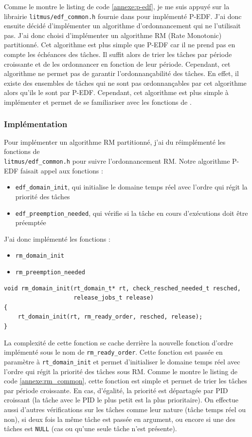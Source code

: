 Comme le montre le listing de code \ref{annexe:p-edf}, je me suis appuyé sur la librairie \texttt{litmus/edf\_common.h} fournie dans \litmus pour implémenté P-EDF. J'ai donc ensuite décidé d'implémenter un algorithme d'ordonnancement qui ne l'utilisait pas. J'ai donc choisi d'implémenter un algorithme RM (Rate Monotonic) partitionné. Cet algorithme est plus simple que P-EDF car il ne prend pas en compte les échéances des tâches. Il suffit alors de trier les tâches par période croissante et de les ordonnancer en fonction de leur période. Cependant, cet algorithme ne permet pas de garantir l'ordonnançabilité des tâches. En effet, il existe des ensembles de tâches qui ne sont pas ordonnançables par cet algorithme alors qu'ils le sont par P-EDF. Cependant, cet algorithme est plus simple à implémenter et permet de se familiariser avec les fonctions de \litmus.


\subsubsection{Implémentation}

Pour implémenter un algorithme RM partitionné, j'ai du réimplémenté les fonctions de \\ \texttt{litmus/edf\_common.h} pour suivre l'ordonnancement RM. Notre algorithme P-EDF faisait appel aux fonctions :
\begin{itemize}
    \item \texttt{edf\_domain\_init}, qui initialise le domaine temps réel avec l'ordre qui régit la priorité des tâches
    \item \texttt{edf\_preemption\_needed}, qui vérifie si la tâche en cours d'exécutions doit être préemptée
\end{itemize}
J'ai donc implémenté les fonctions :
\begin{itemize}
    \item \texttt{rm\_domain\_init}
    \item \texttt{rm\_preemption\_needed}
\end{itemize}
\newpage
\begin{lstlisting}[style=cstyle, caption={Fonction \texttt{rm\_domain\_init}}, label={annexe:rm_domain_init}]
void rm_domain_init(rt_domain_t* rt, check_resched_needed_t resched,
					release_jobs_t release)
{
	rt_domain_init(rt, rm_ready_order, resched, release);
}
\end{lstlisting}

La complexité de cette fonction se cache derrière la nouvelle fonction d'ordre implémenté sous le nom de \texttt{rm\_ready\_order}. Cette fonction est passée en paramètre à \texttt{rt\_domain\_init} et permet d'initialiser le domaine temps réel avec l'ordre qui régit la priorité des tâches sous RM. Comme le montre le listing de code \ref{annexe:rm_common}, cette fonction est simple et permet de trier les tâches par période croissante. En cas, d'égalité, la priorité est départagée par PID croissant (la tâche avec le PID le plus petit est la plus prioritaire). On effectue aussi d'autres vérifications sur les tâches comme leur nature (tâche temps réel ou non), si deux fois la même tâche est passée en argument, ou encore si une des tâches est \texttt{NULL} (cas ou qu'une seule tâche n'est présente).

